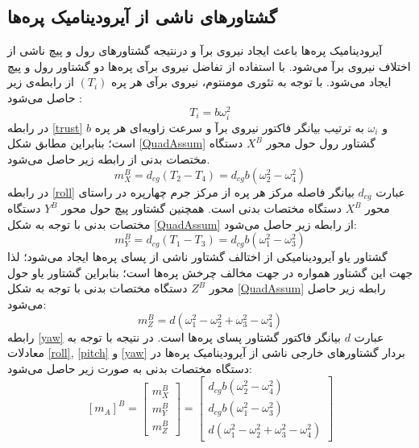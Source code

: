 \subsection{گشتاورهای ناشی از آيرودينامیک پره‌ها}
آیرودینامیک پره‌ها باعث ایجاد نیروی برآ و درنتیجه گشتاورهای رول و پیچ ناشی از اختلاف نیروی 
برآ می‌شود. با استفاده از تفاضل نیروی برآی پره‌ها دو گشتاور رول و پیچ ایجاد می‌شود. با توجه به تئوری مومنتوم، نیروی برآی هر پره 
$(T_i)$
از رابطه‌ی زیر حاصل می‌شود
\cite{Sharifi}
:
\begin{equation}\label{trust}
	T_i = b\omega_i^2
\end{equation}
در رابطه
\ref{trust}
$b$
و 
$\omega_i$
به ترتیب بیانگر فاکتور نیروی برآ و سرعت زاویه‌ای هر پره است؛ بنابراین مطابق شکل 
\ref{QuadAssum}
گشتاور رول حول محور
$X^B$
دستگاه مختصات بدنی از رابطه زیر حاصل می‌شود.
\begin{equation}\label{roll}
	m_X^B = d_{cg}(T_2-T_4) = d_{cg}b(\omega_2^2-\omega_4^2)
\end{equation}
در رابطه 
\ref{roll}
عبارت 
$d_{cg}$
بیانگر فاصله مرکز هر پره از مرکز جرم چهارپره در راستای محور
$X^B$
دستگاه مختصات بدنی است. همچنین گشتاور پیچ حول محور 
$Y^B$
دستگاه مختصات بدنی با توجه به شكل
\ref{QuadAssum}
از رابطه زیر حاصل می‌شود:
\begin{equation}\label{pitch}
	m_Y^B = d_{cg}(T_1-T_3) = d_{cg}b(\omega_1^2-\omega_3^2)
\end{equation}
گشتاور یاو آیرودینامیكی از اختالف گشتاور ناشی از پسای پره‌ها ایجاد می‌شود؛ لذا جهت این 
گشتاور همواره در جهت مخالف چرخش پره‌ها است؛ بنابراین گشتاور یاو حول محور
$Z^B$
دستگاه مختصات بدنی با توجه به شكل
\ref{QuadAssum}
رابطه زیر حاصل می‌شود:
\begin{equation}\label{yaw}
	m_Z^B = d(\omega_1^2-\omega_2^2+\omega_3^2-\omega_4^2)
\end{equation}
رابطه 
\ref{yaw}
عبارت 
$d$
بیانگر فاکتور گشتاور پسای پره‌ها است. در نتیجه با توجه به معادلات
\ref{roll},
\ref{pitch}
و
\ref{yaw}
بردار گشتاورهای خارجی ناشی از آیرودینامیک پره‌ها در دستگاه مختصات بدنی به صورت زیر حاصل می‌شود:
\begin{equation}\label{finaltorque}
	\left[m_A\right]^B = \begin{bmatrix}
		m_X^B\\m_Y^B\\m_Z^B
	\end{bmatrix}
 =  \begin{bmatrix}
 	d_{cg}b(\omega_2^2-\omega_4^2)\\
 	d_{cg}b(\omega_1^2-\omega_3^2)\\
 	d(\omega_1^2-\omega_2^2+\omega_3^2-\omega_4^2)
 \end{bmatrix}
\end{equation}